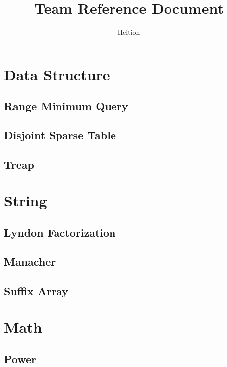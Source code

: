 \documentclass{article}
\begin{document}
\title{Team Reference Document}
\author{Heltion}
\maketitle
\newpage
\begin{multicols}{2}
    \tableofcontents
    \newpage
    \section{Data Structure}
    \subsection{Range Minimum Query}
    
    \subsection{Disjoint Sparse Table}
    
    \subsection{Treap}
    

    \section{String}
    \subsection{Lyndon Factorization}
    
    \subsection{Manacher}
    
    \subsection{Suffix Array}
    
    
    \section{Math}
    \subsection{Power}
    

\end{multicols}
\end{document}
